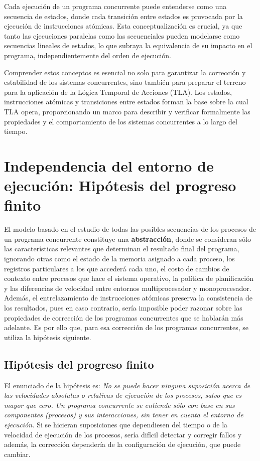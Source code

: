 Cada ejecución de un programa concurrente puede entenderse como una secuencia de estados, donde cada transición entre estados es provocada por la ejecución de instrucciones atómicas. Esta conceptualización es crucial, ya que tanto las ejecuciones paralelas como las secuenciales pueden modelarse como secuencias lineales de estados, lo que subraya la equivalencia de su impacto en el programa, independientemente del orden de ejecución.

Comprender estos conceptos es esencial no solo para garantizar la corrección y estabilidad de los sistemas concurrentes, sino también para preparar el terreno para la aplicación de la Lógica Temporal de Acciones (TLA). Los estados, instrucciones atómicas y transiciones entre estados forman la base sobre la cual TLA opera, proporcionando un marco para describir y verificar formalmente las propiedades y el comportamiento de los sistemas concurrentes a lo largo del tiempo.

\section{Independencia del entorno de ejecución: Hipótesis del progreso finito}\label{subsec:concurrentprogfinit}
El modelo basado en el estudio de todas las posibles secuencias de los procesos de un programa concurrente constituye una \textbf{abstracción}, donde se consideran sólo las características relevantes que determinan el resultado final del programa, ignorando otras como el estado de la memoria asignado a cada proceso, los registros particulares a los que accederá cada uno, el costo de cambios de contexto entre procesos que hace el sistema operativo, la política de planificación y las diferencias de velocidad entre entornos multiprocesador y monoprocesador. Además, el entrelazamiento de instrucciones atómicas preserva la consistencia de los resultados, pues en caso contrario, sería imposible poder razonar sobre las propiedades de corrección de los programas concurrentes que se hablarán más adelante. Es por ello que, para esa corrección de los programas concurrentes, se utiliza la hipótesis siguiente.

\subsection{Hipótesis del progreso finito}\label{subsubsec:concurrentprogfinithip}
El enunciado de la hipótesis es: \textit{No se puede hacer ninguna suposición acerca de las velocidades absolutas o relativas de ejecución de los procesos, salvo que es mayor que cero. Un programa concurrente se entiende sólo con base en sus componentes (procesos) y sus interacciones, sin tener en cuenta el entorno de ejecución.} Si se hicieran suposiciones que dependiesen del tiempo o de la velocidad de ejecución de los procesos, sería difícil detectar y corregir fallos y además, la corrección dependería de la configuración de ejecución, que puede cambiar.


